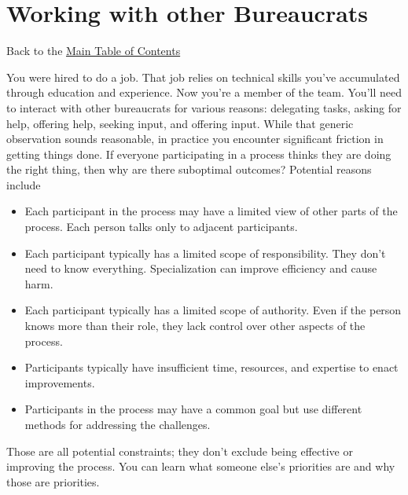 \chapter{Working with other Bureaucrats\label{sec:working-with-other-bureaucrats}}
{\footnotesize Back to the \hyperref[sec:toc]{Main Table of Contents}}
\ifshowminitoc
\minitoc 
\fi

You were hired to do a job. That job relies on technical skills you've accumulated through education and experience. Now you're a member of 
 the team. You'll need to interact with other bureaucrats for various reasons:
delegating tasks, asking for help, offering help, seeking input, and offering input.
While that generic observation sounds reasonable, in practice you encounter significant friction in getting things done. 
If everyone participating in a process thinks they are doing the right thing, then why are there suboptimal outcomes? Potential reasons include
\begin{itemize}
    \item Each participant in the process may have a limited view of other parts of the process. Each person talks only to adjacent participants.
    \item Each participant typically has a limited scope of responsibility. They don't need to know everything. Specialization can improve efficiency and cause harm.
    \item Each participant typically has a limited scope of authority. Even if the person knows more than  their role, they lack control over other aspects of the process.
    \item Participants typically have insufficient time, resources, and expertise to enact improvements.
    \item Participants in the process may have a common goal but use different methods for addressing the challenges.
\end{itemize}
Those are all potential constraints; they don't exclude being effective or improving the process. 
You can learn what someone else's priorities are and why those are priorities.

